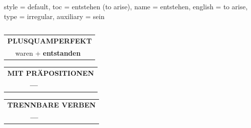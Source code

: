\begin{verbentry}{
  style = {default},
  toc = {entstehen (to arise)},
  name = {entstehen},
  english = {to arise},
  type = {irregular},
  auxiliary = {sein}
}
\begin{tabular}{rl}
  \end{tabular}
\hfill
   \begin{tabular}{rl}
      \multicolumn{2}{l}{\textbf{PLUSQUAMPERFEKT}}\\
   & waren + \textbf{entstanden}\\
  \end{tabular}
  
\vspace{10pt}

\begin{tabular}{lll}
\multicolumn{3}{l}{\textbf{MIT PRÄPOSITIONEN}}\\
& \textbf{---} & \\
\end{tabular}
\hfill
\begin{tabular}{lll}
\multicolumn{3}{l}{\textbf{TRENNBARE VERBEN}}\\
& \textbf{---} & \\
\end{tabular}

  \vspace{-5pt}
\end{verbentry}

